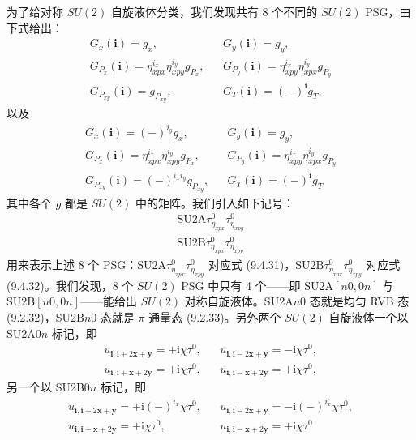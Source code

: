 为了给对称 $SU(2)$ 自旋液体分类，我们发现共有 8 个不同的 $SU(2)$ PSG，由下式给出：
\begin{equation*}
\begin{array}{rcl}
G_{x}(\pmb{i})=g_{x}, & & G_{y}(\pmb{i})=g_{y},\\[2pt]
G_{P_{x}}(\pmb{i})=\eta_{xpx}^{i_{x}}\eta_{xpy}^{i_{y}}g_{P_{x}}, & & G_{P_{y}}(\pmb{i})=\eta_{xpy}^{i_{x}}\eta_{xpx}^{i_{y}}g_{P_{y}}\\[2pt]
G_{P_{xy}}(\pmb{i})=g_{P_{xy}}, & & G_{T}(\pmb{i})=(-)^{\pmb{i}}g_{T},
\end{array}
\tag{9.4.31}
\end{equation*}
以及
\begin{equation*}
\begin{array}{rcl}
G_{x}(\pmb{i})=(-)^{i_{y}}g_{x}, & & G_{y}(\pmb{i})=g_{y},\\[2pt]
G_{P_{x}}(\pmb{i})=\eta_{xpx}^{i_{x}}\eta_{xpy}^{i_{y}}g_{P_{x}}, & & G_{P_{y}}(\pmb{i})=\eta_{xpy}^{i_{x}}\eta_{xpx}^{i_{y}}g_{P_{y}}\\[2pt]
G_{P_{xy}}(\pmb{i})=(-)^{i_{x}i_{y}}g_{P_{xy}}, & & G_{T}(\pmb{i})=(-)^{\pmb{i}}g_{T}
\end{array}
\tag{9.4.32}
\end{equation*}
其中各个 $g$ 都是 $SU(2)$ 中的矩阵。我们引入如下记号：
\begin{equation*}
\begin{array}{l}
\text{SU2A}\tau_{\eta_{xpx}}^{0}\tau_{\eta_{xpy}}^{0}\\[2pt]
\text{SU2B}\tau_{\eta_{xpx}}^{0}\tau_{\eta_{xpy}}^{0}
\end{array}
\tag{9.4.33}
\end{equation*}
用来表示上述 8 个 PSG：$\text{SU2A}\tau_{\eta_{xpx}}^{0}\tau_{\eta_{xpy}}^{0}$ 对应式 (9.4.31)，$\text{SU2B}\tau_{\eta_{xpx}}^{0}\tau_{\eta_{xpy}}^{0}$ 对应式 (9.4.32)。我们发现，8 个 $SU(2)$ PSG 中只有 4 个——即 $\text{SU2A}[n0,0n]$ 与 $\text{SU2B}[n0,0n]$——能给出 $SU(2)$ 对称自旋液体。SU2A$n0$ 态就是均匀 RVB 态 (9.2.32)，SU2B$n0$ 态就是 $\pi$ 通量态 (9.2.33)。另外两个 $SU(2)$ 自旋液体一个以 SU2A$0n$ 标记，即
\begin{equation*}
\begin{array}{rcl}
u_{\pmb{i},\pmb{i}+2\pmb{x}+\pmb{y}}=+\mathrm{i}\chi\tau^{0}, & & u_{\pmb{i},\pmb{i}-2\pmb{x}+\pmb{y}}=-\mathrm{i}\chi\tau^{0},\\[2pt]
u_{\pmb{i},\pmb{i}+\pmb{x}+2\pmb{y}}=+\mathrm{i}\chi\tau^{0}, & & u_{\pmb{i},\pmb{i}-\pmb{x}+2\pmb{y}}=+\mathrm{i}\chi\tau^{0},
\end{array}
\tag{9.4.34}
\end{equation*}
另一个以 SU2B$0n$ 标记，即
\begin{equation*}
\begin{array}{rcl}
u_{\pmb{i},\pmb{i}+2\pmb{x}+\pmb{y}}=+\mathrm{i}(-)^{i_{x}}\chi\tau^{0}, & & u_{\pmb{i},\pmb{i}-2\pmb{x}+\pmb{y}}=-\mathrm{i}(-)^{i_{x}}\chi\tau^{0},\\[2pt]
u_{\pmb{i},\pmb{i}+\pmb{x}+2\pmb{y}}=+\mathrm{i}\chi\tau^{0}, & & u_{\pmb{i},\pmb{i}-\pmb{x}+2\pmb{y}}=+\mathrm{i}\chi\tau^{0}
\end{array}
\tag{9.4.35}
\end{equation*}

